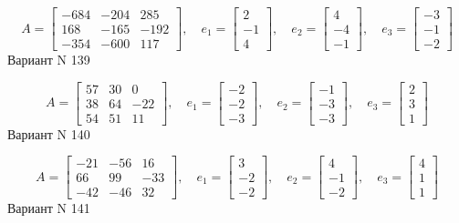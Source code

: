 \documentclass[11pt]{report}
\begin{document}
$$A = \left[\begin{matrix}-684 & -204 & 285\\168 & -165 & -192\\-354 & -600 & 117\end{matrix}\right],\quad e_1 = \left[\begin{matrix}2\\-1\\4\end{matrix}\right],\quad e_2 = \left[\begin{matrix}4\\-4\\-1\end{matrix}\right],\quad e_3 = \left[\begin{matrix}-3\\-1\\-2\end{matrix}\right]$$Вариант N 139

$$A = \left[\begin{matrix}57 & 30 & 0\\38 & 64 & -22\\54 & 51 & 11\end{matrix}\right],\quad e_1 = \left[\begin{matrix}-2\\-2\\-3\end{matrix}\right],\quad e_2 = \left[\begin{matrix}-1\\-3\\-3\end{matrix}\right],\quad e_3 = \left[\begin{matrix}2\\3\\1\end{matrix}\right]$$Вариант N 140

$$A = \left[\begin{matrix}-21 & -56 & 16\\66 & 99 & -33\\-42 & -46 & 32\end{matrix}\right],\quad e_1 = \left[\begin{matrix}3\\-2\\-2\end{matrix}\right],\quad e_2 = \left[\begin{matrix}4\\-1\\-2\end{matrix}\right],\quad e_3 = \left[\begin{matrix}4\\1\\1\end{matrix}\right]$$Вариант N 141
\end{document}
